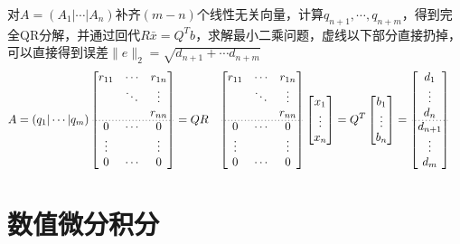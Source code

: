 \documentclass[twocolumn]{article}
\begin{document}
\newpage
对$A=(A_1|\cdots|A_n)$补齐$(m-n)$个线性无关向量，计算$q_{n+1},\cdots,q_{n+m}$，得到完全QR分解，并通过回代$R\bar{x}=Q^Tb$，求解最小二乘问题，虚线以下部分直接扔掉，可以直接得到误差$\|e\|_2=\sqrt{d_{n+1}+\cdots d_{n+m}}$
\begin{align*}
    A=(q_1|\cdots|q_m)
    \begin{bmatrix}
        r_{11} & \cdots & r_{1n} \\
               & \ddots & \vdots \\
               &        & r_{nn} \\
        \cdashline{1-3}[0.8pt/2pt]
        0      & \cdots & 0      \\
        \vdots &        & \vdots \\
        0      & \cdots & 0
    \end{bmatrix}
     & =QR
     &
    \begin{bmatrix}
        r_{11} & \cdots & r_{1n} \\
               & \ddots & \vdots \\
               &        & r_{nn} \\
        \cdashline{1-3}[0.8pt/2pt]
        0      & \cdots & 0      \\
        \vdots &        & \vdots \\
        0      & \cdots & 0
    \end{bmatrix}
    \begin{bmatrix}
        x_1    \\
        \vdots \\
        x_n
    \end{bmatrix}
     & =Q^T
    \begin{bmatrix}
        b_1    \\
        \vdots \\
        b_n
    \end{bmatrix}
    =
    \begin{bmatrix}
        d_1     \\
        \vdots  \\
        d_n     \\
        \cdashline{1-1}[0.8pt/2pt]
        d_{n+1} \\
        \vdots  \\
        d_m
    \end{bmatrix}
\end{align*}

\section{数值微分积分}
\end{document}
